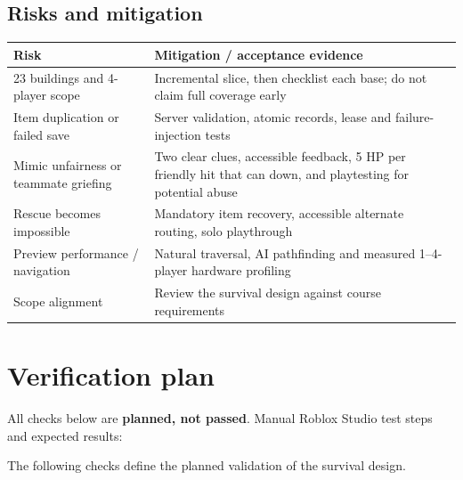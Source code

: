 \subsection{Risks and mitigation}
\begin{longtable}{@{}p{}p{}@{}}
\toprule
\textbf{Risk} & \textbf{Mitigation / acceptance evidence} \\ \midrule\endhead
23 buildings and 4-player scope & Incremental slice, then checklist each base; do not claim full coverage early \\
Item duplication or failed save & Server validation, atomic records, lease and failure-injection tests \\
Mimic unfairness or teammate griefing & Two clear clues, accessible feedback, 5 HP per friendly hit that can down, and playtesting for potential abuse \\
Rescue becomes impossible & Mandatory item recovery, accessible alternate routing, solo playthrough \\
Preview performance / navigation & Natural traversal, AI pathfinding and measured 1--4-player hardware profiling \\
Scope alignment & Review the survival design against course requirements \\
\bottomrule
\end{longtable}

\section{Verification plan}
All checks below are \textbf{planned, not passed}. Manual Roblox Studio test steps and expected results:

The following checks define the planned validation of the survival design.

